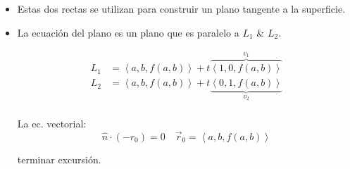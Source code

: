 \begin{itemize}
    \item Estas dos rectas se utilizan para construir un plano tangente a la superficie.
    \item La ecuación del plano es un plano que es paralelo a $L_1$ \& $L_2$.
        \begin{center}
           \begin{align*}
               L_1&= \left\langle a,b,f(a,b) \right\rangle + t \overbrace{\left\langle 1,0,f(a,b) \right\rangle}^{v_1} \\ 
               L_2&= \left\langle a,b,f(a,b) \right\rangle + t \underbrace{\left\langle 0,1,f(a,b) \right\rangle}_{v_2} \\ 
           \end{align*}
        \end{center}
        La ec. vectorial:
            \[
              \hat{n} \cdot (-r_0)=0 \quad \vec{r}_0  = \left\langle a,b,f(a,b) \right\rangle 
            \]
                   
        terminar excursión.
\end{itemize}


